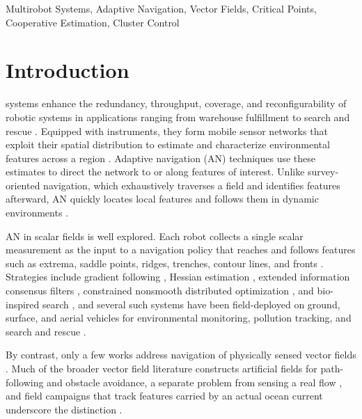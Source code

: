\documentclass[lettersize,journal]{IEEEtran}
\begin{document}
\begin{IEEEkeywords}
Multirobot Systems, Adaptive Navigation, Vector Fields, Critical Points, Cooperative Estimation, Cluster Control
\end{IEEEkeywords}


\section{Introduction}

 systems enhance the redundancy, throughput, coverage, and reconfigurability of robotic systems in applications ranging from warehouse fulfillment to search and rescue \cite{1}. Equipped with instruments, they form mobile sensor networks that exploit their spatial distribution to estimate and characterize environmental features across a region \cite{2,3,4}. Adaptive navigation (AN) techniques use these estimates to direct the network to or along features of interest. Unlike survey-oriented navigation, which exhaustively traverses a field and identifies features afterward, AN quickly locates local features and follows them in dynamic environments \cite{5,6,7}.

AN in scalar fields is well explored. Each robot collects a single scalar measurement as the input to a navigation policy that reaches and follows features such as extrema, saddle points, ridges, trenches, contour lines, and fronts \cite{5,6,7,8,9}. Strategies include gradient following \cite{10}, Hessian estimation \cite{4}, extended information consensus filters \cite{11,13}, constrained nonsmooth distributed optimization \cite{14}, and bio-inspired search \cite{15}, and several such systems have been field-deployed on ground, surface, and aerial vehicles for environmental monitoring, pollution tracking, and search and rescue \cite{10,18,19,20}.

By contrast, only a few works address navigation of physically sensed vector fields \cite{21,22,23}. Much of the broader vector field literature constructs artificial fields for path-following and obstacle avoidance, a separate problem from sensing a real flow \cite{24,25,26,28}, and field campaigns that track features carried by an actual ocean current underscore the distinction \cite{29}.
\end{document}
